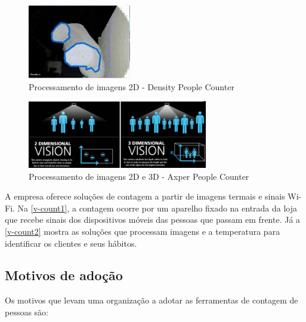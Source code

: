 \begin{itemize}
\begin{figure}[htb]
  \caption{\label{density}Processamento de imagens 2D - Density People Counter}
  \begin{center}
    \includegraphics[width=0.40\textwidth]{img/density.png}
  \end{center}
\end{figure}

\begin{figure}[htb]
  \caption{\label{axper}Processamento de imagens 2D e 3D - Axper People Counter}
  \begin{center}
    \includegraphics[width=0.70\textwidth]{img/axper.png}
  \end{center}
\end{figure}

A empresa \cite{V-Count2017} oferece soluções de contagem a partir de imagens termais e sinais Wi-Fi. Na \autoref{v-count1}, a contagem ocorre por um
aparelho fixado na entrada da loja que recebe sinais dos dispositivos móveis das pessoas que passam em frente. Já a \autoref{v-count2}
mostra as soluções que processam imagens e a temperatura para identificar os clientes e seus hábitos.

\end{itemize}

\subsection{Motivos de adoção}
Os motivos que levam uma organização a adotar as ferramentas de contagem de pessoas são:

